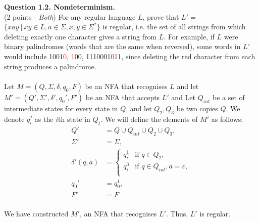\documentclass{article}
\newenvironment{question}[2]
{
    {\large \textbf{Question #1.}}\\
    #2\\\\
}{\newpage}
\begin{document}
\begin{question}{1.2. Nondeterminism}
    {
        (2 points - \textit{Both}) For any regular language $L$, prove that $L' = $
        $\{xay\ |\ xy \in L, a \in \Sigma, x, y \in \Sigma^*\}$ is regular, i.e. the set of
        all strings from which deleting exactly one character gives a string from $L$. For
        example, if $L$ were binary palindromes (words that are the same when reversed),
        some words in $L'$ would include 1001\textcolor{red}{0}, \textcolor{red}{1}00,
        1110001\textcolor{red}{0}11, since deleting the red character from each string
        produces a palindrome.
    }
    Let $M = (Q, \Sigma, \delta, q_0, F)$ be an NFA that recognises $L$ and
    let $M' = (Q', \Sigma', \delta', q_0', F')$ be an NFA that accepts $L'$ and
    Let $Q_{int}$ be a set of intermediate states for every state in
    $Q$, and let $Q_2, Q_3$ be two copies $Q$. We denote $q_i^j$ as the $i$th state
    in $Q_j$.
    We will define the elements of $M'$ as follows:
    \begin{align*}
        Q'            & = Q \cup Q_{int} \cup Q_2 \cup Q_3,                  \\
        \Sigma'       & = \Sigma,                                            \\
        \delta'(q, a) & = \begin{cases}
                              q^1_i & \text{if } q \in Q_2,                      \\
                              q^3_i & \text{if } q \in Q_{int}, a = \varepsilon, \\
                          \end{cases} \\
        q_0'          & = q_0^1,                                             \\
        F'            & = F                                                  \\
    \end{align*}

    We have constructed $M'$, an NFA that recognises $L'$. Thus, $L'$ is regular.

\end{question}
\end{document}
